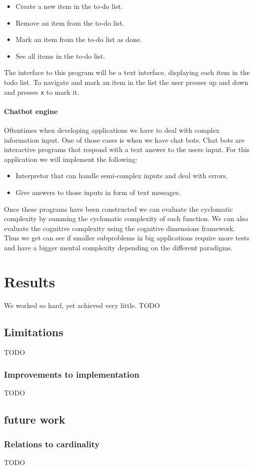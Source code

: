\documentclass[12pt]{report}
\theoremstyle{definition}
\theoremstyle{theorem}
\begin{document}
\begin{itemize}
    \item Create a new item in the to-do list.
    \item Remove an item from the to-do list.
    \item Mark an item from the to-do list as done.
    \item See all items in the to-do list.
\end{itemize}

The interface to this program will be a text interface, displaying each item in
the todo list. To navigate and mark an item in the list the user presses up and
down and presses \texttt{x} to mark it.

\subsubsection*{Chatbot engine}

Oftentimes when developing applications we have to deal with complex information
input. One of those cases is when we have chat bots. Chat bots are interactive
programs that respond with a text answer to the users input. For this
application we will implement the following:

\begin{itemize}
    \item Interpretor that can handle semi-complex inputs and deal with errors.
    \item Give answers to those inputs in form of text messages.
\end{itemize}

\noindent Once these programs have been constructed we can evaluate the
cyclomatic complexity by summing the cyclomatic complexity of each function. We
can also evaluate the cognitive complexity using the cognitive dimensions
framework. Thus we get can see if smaller subproblems in big applications
require more tests and have a bigger mental complexity depending on the different
paradigms.

\chapter{Results}\label{results}
We worked so hard, yet achieved very little. TODO

\section{Limitations}\label{limitations}

TODO

\subsection{Improvements to implementation}
TODO

\section{future work}
\subsection{Relations to cardinality}
TODO



\end{document}
